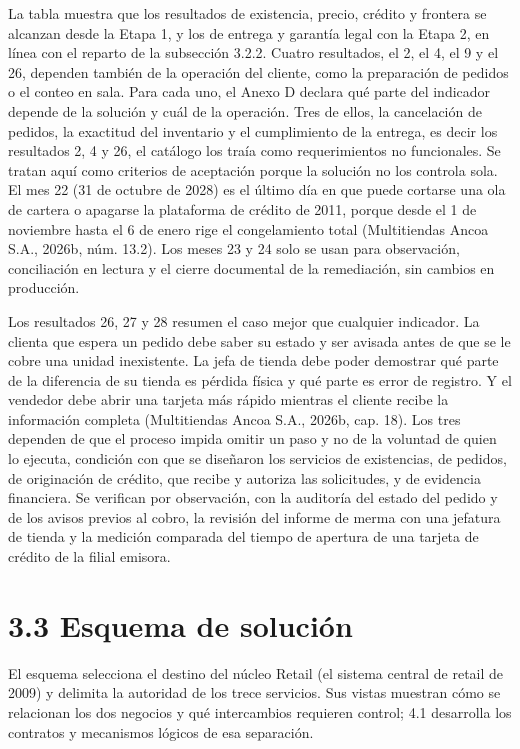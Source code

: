 \documentclass[11pt]{article}
\begin{document}
La tabla muestra que los resultados de existencia, precio, crédito y frontera se alcanzan desde la Etapa 1, y los de entrega y garantía legal con la Etapa 2, en línea con el reparto de la subsección 3.2.2. Cuatro resultados, el 2, el 4, el 9 y el 26, dependen también de la operación del cliente, como la preparación de pedidos o el conteo en sala. Para cada uno, el Anexo D declara qué parte del indicador depende de la solución y cuál de la operación. Tres de ellos, la cancelación de pedidos, la exactitud del inventario y el cumplimiento de la entrega, es decir los resultados 2, 4 y 26, el catálogo los traía como requerimientos no funcionales. Se tratan aquí como criterios de aceptación porque la solución no los controla sola. El mes 22 (31 de octubre de 2028) es el último día en que puede cortarse una ola de cartera o apagarse la plataforma de crédito de 2011, porque desde el 1 de noviembre hasta el 6 de enero rige el congelamiento total (Multitiendas Ancoa S.A., 2026b, núm. 13.2). Los meses 23 y 24 solo se usan para observación, conciliación en lectura y el cierre documental de la remediación, sin cambios en producción.

Los resultados 26, 27 y 28 resumen el caso mejor que cualquier indicador. La clienta que espera un pedido debe saber su estado y ser avisada antes de que se le cobre una unidad inexistente. La jefa de tienda debe poder demostrar qué parte de la diferencia de su tienda es pérdida física y qué parte es error de registro. Y el vendedor debe abrir una tarjeta más rápido mientras el cliente recibe la información completa (Multitiendas Ancoa S.A., 2026b, cap. 18). Los tres dependen de que el proceso impida omitir un paso y no de la voluntad de quien lo ejecuta, condición con que se diseñaron los servicios de existencias, de pedidos, de originación de crédito, que recibe y autoriza las solicitudes, y de evidencia financiera. Se verifican por observación, con la auditoría del estado del pedido y de los avisos previos al cobro, la revisión del informe de merma con una jefatura de tienda y la medición comparada del tiempo de apertura de una tarjeta de crédito de la filial emisora.


\section{3.3 Esquema de solución}

El esquema selecciona el destino del núcleo Retail (el sistema central de retail de 2009) y delimita la autoridad de los trece servicios. Sus vistas muestran cómo se relacionan los dos negocios y qué intercambios requieren control; 4.1 desarrolla los contratos y mecanismos lógicos de esa separación.
\end{document}
